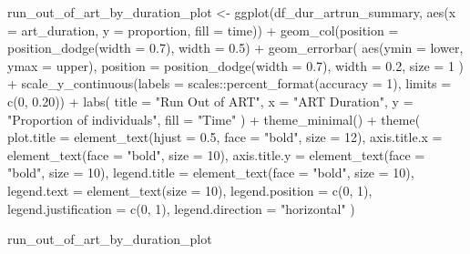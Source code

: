 \documentclass[
  letterpaper,
  DIV=11,
  numbers=noendperiod]{scrartcl}
\newenvironment{Shaded}{\begin{snugshade}}{\end{snugshade}}
\newcommand{\AttributeTok}[1]{\textcolor[rgb]{0.40,0.45,0.13}{#1}}
\newcommand{\DecValTok}[1]{\textcolor[rgb]{0.68,0.00,0.00}{#1}}
\newcommand{\FloatTok}[1]{\textcolor[rgb]{0.68,0.00,0.00}{#1}}
\newcommand{\FunctionTok}[1]{\textcolor[rgb]{0.28,0.35,0.67}{#1}}
\newcommand{\NormalTok}[1]{\textcolor[rgb]{0.00,0.23,0.31}{#1}}
\newcommand{\OtherTok}[1]{\textcolor[rgb]{0.00,0.23,0.31}{#1}}
\newcommand{\SpecialCharTok}[1]{\textcolor[rgb]{0.37,0.37,0.37}{#1}}
\newcommand{\StringTok}[1]{\textcolor[rgb]{0.13,0.47,0.30}{#1}}
\begin{document}
\begin{Shaded}
\begin{Highlighting}[]
\NormalTok{run\_out\_of\_art\_by\_duration\_plot }\OtherTok{\textless{}{-}} \FunctionTok{ggplot}\NormalTok{(df\_dur\_artrun\_summary, }\FunctionTok{aes}\NormalTok{(}\AttributeTok{x =}\NormalTok{ art\_duration, }\AttributeTok{y =}\NormalTok{ proportion, }\AttributeTok{fill =}\NormalTok{ time)) }\SpecialCharTok{+}
  \FunctionTok{geom\_col}\NormalTok{(}\AttributeTok{position =} \FunctionTok{position\_dodge}\NormalTok{(}\AttributeTok{width =} \FloatTok{0.7}\NormalTok{), }\AttributeTok{width =} \FloatTok{0.5}\NormalTok{) }\SpecialCharTok{+}
  \FunctionTok{geom\_errorbar}\NormalTok{(}
    \FunctionTok{aes}\NormalTok{(}\AttributeTok{ymin =}\NormalTok{ lower, }\AttributeTok{ymax =}\NormalTok{ upper),}
    \AttributeTok{position =} \FunctionTok{position\_dodge}\NormalTok{(}\AttributeTok{width =} \FloatTok{0.7}\NormalTok{),}
    \AttributeTok{width =} \FloatTok{0.2}\NormalTok{,}
    \AttributeTok{size =} \DecValTok{1}
\NormalTok{  ) }\SpecialCharTok{+}
  \FunctionTok{scale\_y\_continuous}\NormalTok{(}\AttributeTok{labels =}\NormalTok{ scales}\SpecialCharTok{::}\FunctionTok{percent\_format}\NormalTok{(}\AttributeTok{accuracy =} \DecValTok{1}\NormalTok{), }\AttributeTok{limits =} \FunctionTok{c}\NormalTok{(}\DecValTok{0}\NormalTok{, }\FloatTok{0.20}\NormalTok{)) }\SpecialCharTok{+}
  \FunctionTok{labs}\NormalTok{(}
    \AttributeTok{title =} \StringTok{"Run Out of ART"}\NormalTok{,}
    \AttributeTok{x =} \StringTok{"ART Duration"}\NormalTok{,}
    \AttributeTok{y =} \StringTok{"Proportion of individuals"}\NormalTok{,}
    \AttributeTok{fill =} \StringTok{"Time"}
\NormalTok{  ) }\SpecialCharTok{+}
  \FunctionTok{theme\_minimal}\NormalTok{() }\SpecialCharTok{+}
  \FunctionTok{theme}\NormalTok{(}
    \AttributeTok{plot.title =} \FunctionTok{element\_text}\NormalTok{(}\AttributeTok{hjust =} \FloatTok{0.5}\NormalTok{, }\AttributeTok{face =} \StringTok{"bold"}\NormalTok{, }\AttributeTok{size =} \DecValTok{12}\NormalTok{),}
    \AttributeTok{axis.title.x =} \FunctionTok{element\_text}\NormalTok{(}\AttributeTok{face =} \StringTok{"bold"}\NormalTok{, }\AttributeTok{size =} \DecValTok{10}\NormalTok{),}
    \AttributeTok{axis.title.y =} \FunctionTok{element\_text}\NormalTok{(}\AttributeTok{face =} \StringTok{"bold"}\NormalTok{, }\AttributeTok{size =} \DecValTok{10}\NormalTok{),}
    \AttributeTok{legend.title =} \FunctionTok{element\_text}\NormalTok{(}\AttributeTok{face =} \StringTok{"bold"}\NormalTok{, }\AttributeTok{size =} \DecValTok{10}\NormalTok{),}
    \AttributeTok{legend.text =} \FunctionTok{element\_text}\NormalTok{(}\AttributeTok{size =} \DecValTok{10}\NormalTok{),}
    \AttributeTok{legend.position =} \FunctionTok{c}\NormalTok{(}\DecValTok{0}\NormalTok{, }\DecValTok{1}\NormalTok{),}
    \AttributeTok{legend.justification =} \FunctionTok{c}\NormalTok{(}\DecValTok{0}\NormalTok{, }\DecValTok{1}\NormalTok{),}
    \AttributeTok{legend.direction =} \StringTok{"horizontal"}
\NormalTok{  )}

\NormalTok{run\_out\_of\_art\_by\_duration\_plot}
\end{Highlighting}
\end{Shaded}
\end{document}
